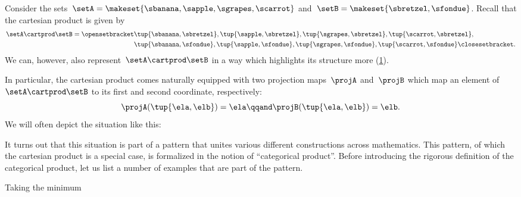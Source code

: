 \begin{example}
    Consider the sets~$\setA = \makeset{\sbanana, \sapple, \sgrapes, \scarrot}$ and~$\setB = \makeset{ \sbretzel, \sfondue }$.
    Recall that the cartesian product is given by
    \begin{equation}
        \label{eq:cart-prod-example}
        \begin{aligned}
            \setA \cartprod \setB = \opensetbracket & \tup{\sbanana, \sbretzel}, \tup{\sapple, \sbretzel}, \tup{\sgrapes, \sbretzel}, \tup{\scarrot, \sbretzel}, \\
                                                    & \tup{\sbanana,\sfondue}, \tup{\sapple, \sfondue}, \tup{\sgrapes, \sfondue}, \tup{\scarrot, \sfondue} \closesetbracket.
        \end{aligned}
    \end{equation}
    We can, however, also represent~$\setA \cartprod \setB$ in a way which highlights its structure more (\cref{fig:example_cartesian}).
    \begin{figure}[h]
        \centering
        \caption{}
        \label{fig:example_cartesian}
    \end{figure}
    In particular, the cartesian product comes naturally equipped with two projection maps~$\projA$ and~$\projB$ which map an element of~$\setA \cartprod \setB$ to its first and second coordinate, respectively:
    \begin{equation}
        \projA(\tup{\ela,\elb}) =  \ela  \qqand \projB(\tup{\ela,\elb}) = \elb.
    \end{equation}
    We will often depict the situation like this:
\end{example}

It turns out that this situation is part of a pattern that unites various different constructions across mathematics.
This pattern, of which the cartesian product is a special case, is formalized in the notion of ``categorical product''.
Before introducing the rigorous definition of the categorical product, let us list a number of examples that are part of the pattern.

\begin{marginfigure}
    \centering
    \caption{Taking the minimum}
    \label{fig:exa_prod_min}
\end{marginfigure}

